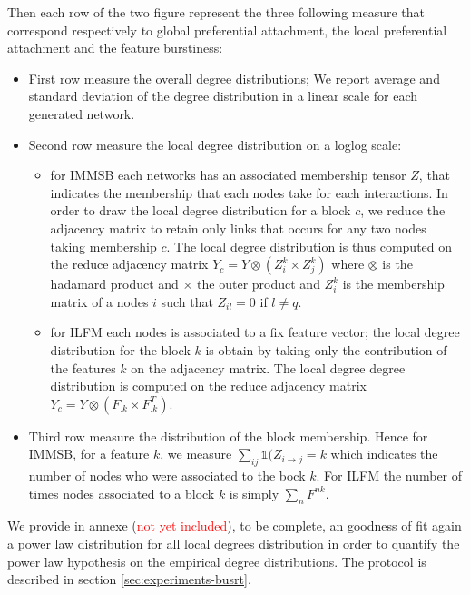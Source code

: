 Then each row of the two figure represent the three following measure that correspond respectively to global preferential attachment, the local preferential attachment and the feature burstiness:
\begin{itemize}
    \item First row measure the overall degree distributions; We report average and standard deviation of the degree distribution in a linear scale for each generated network.
    \item Second row measure the local degree distribution on a loglog scale:
        \begin{itemize}
            \item for IMMSB each networks has an associated membership tensor $Z$, that indicates the membership that each nodes take for each interactions. In order to draw the local degree distribution for a block $c$, we reduce the adjacency matrix to retain only links that occurs for any two nodes taking membership $c$. The local degree distribution is thus computed on the reduce adjacency matrix $Y_c = Y \otimes (Z_i^k \times Z_j^k)$ where $\otimes$ is the hadamard product and $\times$ the outer product and $Z_i^k$ is the membership matrix of a nodes $i$ such that $Z_{il}=0$ if $l\neq q$.
            \item for ILFM each nodes is associated to a fix feature vector; the local degree distribution for the block $k$ is obtain by taking only the contribution 
                of the features $k$ on the adjacency matrix. The local degree degree distribution is computed on the reduce adjacency matrix $Y_c = Y \otimes (F_{.k}\times F_{.k}^T)$. 
        \end{itemize}
    \item Third row measure the distribution of the block membership. Hence for IMMSB, for a feature $k$, we measure $\sum_{ij} \mathbb{1}(Z_{i\rightarrow j} = k$ which indicates the number of nodes who were associated to the bock $k$. For ILFM the number of times nodes associated to a block $k$ is simply $\sum_n F^{nk}$.
\end{itemize}


We provide in annexe (\textcolor{red}{not yet included}), to be complete, an goodness of fit again a power law distribution for all local degrees distribution in order to quantify the power law hypothesis on the empirical degree distributions. The protocol is described in section \ref{sec:experiments-busrt}. 


